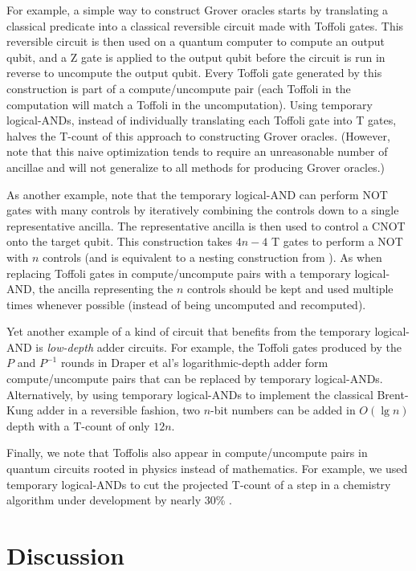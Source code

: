 \documentclass[twocolumn]{quantumarticle-customized}
\begin{document}
For example, a simple way to construct Grover oracles starts by translating a classical predicate into a classical reversible circuit made with Toffoli gates.
This reversible circuit is then used on a quantum computer to compute an output qubit, and a Z gate is applied to the output qubit before the circuit is run in reverse to uncompute the output qubit.
Every Toffoli gate generated by this construction is part of a compute/uncompute pair (each Toffoli in the computation will match a Toffoli in the uncomputation).
Using temporary logical-ANDs, instead of individually translating each Toffoli gate into T gates, halves the T-count of this approach to constructing Grover oracles.
(However, note that this naive optimization tends to require an unreasonable number of ancillae and will not generalize to all methods for producing Grover oracles.)

As another example, note that the temporary logical-AND can perform NOT gates with many controls by iteratively combining the controls down to a single representative ancilla.
The representative ancilla is then used to control a CNOT onto the target qubit.
This construction takes $4n-4$ T gates to perform a NOT with $n$ controls (and is equivalent to a nesting construction from \cite{Jones2013}).
As when replacing Toffoli gates in compute/uncompute pairs with a temporary logical-AND, the ancilla representing the $n$ controls should be kept and used multiple times whenever possible (instead of being uncomputed and recomputed).

Yet another example of a kind of circuit that benefits from the temporary logical-AND is {\em low-depth} adder circuits.
For example, the Toffoli gates produced by the $P$ and $P^{-1}$ rounds in Draper et al's logarithmic-depth adder \cite{Draper2004} form compute/uncompute pairs that can be replaced by temporary logical-ANDs.
Alternatively, by using temporary logical-ANDs to implement the classical Brent-Kung adder \cite{brent1982} in a reversible fashion, two $n$-bit numbers can be added in $O(\lg n)$ depth with a T-count of only $12n$.

Finally, we note that Toffolis also appear in compute/uncompute pairs in quantum circuits rooted in physics instead of mathematics.
For example, we used temporary logical-ANDs to cut the projected T-count of a step in a chemistry algorithm under development by nearly 30\% \cite{RyanEmails2017}.


\section*{Discussion}
\end{document}
